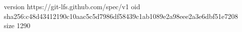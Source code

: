 version https://git-lfs.github.com/spec/v1
oid sha256:c48d43412190c10aac5c5d7986df58439c1ab1089e2a98eee2a3e6dbf51e7208
size 1290
